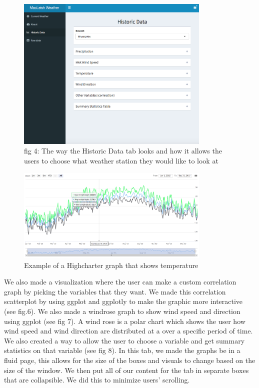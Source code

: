 \documentclass[10pt,letterpaper]{article}
\begin{document}
\begin{figure}
\includegraphics[width=350px]{Weatherdashboard} \caption{fig 4: The way the Historic Data tab looks and how it allows the users to choose what weather station they would like to look at}\label{fig:unnamed-chunk-4}
\end{figure}

\begin{figure}
\includegraphics[width=350px]{highchart} \caption{Example of a Highcharter graph that shows temperature}\label{fig:unnamed-chunk-5}
\end{figure}

We also made a visualization where the user can make a custom
correlation graph by picking the variables that they want. We made this
correlation scatterplot by using ggplot and ggplotly to make the graphic
more interactive (see fig.6). We also made a windrose graph to show wind
speed and direction using ggplot (see fig 7). A wind rose is a polar
chart which shows the user how wind speed and wind direction are
distributed at a over a specific period of time. We also created a way
to allow the user to choose a variable and get summary statistics on
that variable (see fig 8). In this tab, we made the graphs be in a fluid
page, this allows for the size of the boxes and visuals to change based
on the size of the window. We then put all of our content for the tab in
separate boxes that are collapsible. We did this to minimize users'
scrolling.
\end{document}
